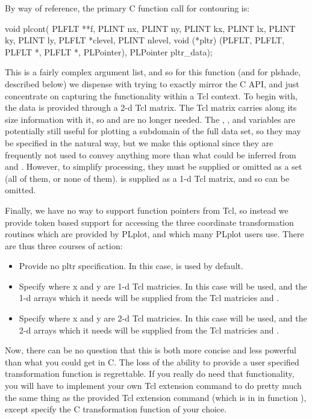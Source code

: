 By way of reference, the primary C function call for contouring is:
\begin{example}
void plcont( PLFLT **f, PLINT nx, PLINT ny, PLINT kx, PLINT lx,
             PLINT ky, PLINT ly, PLFLT *clevel, PLINT nlevel,
             void (*pltr) (PLFLT, PLFLT, PLFLT *, PLFLT *, PLPointer),
             PLPointer pltr_data);
\end{example}

This is a fairly complex argument list, and so for this function (and
for plshade, described below) we dispense with trying to exactly
mirror the C API, and just concentrate on capturing the functionality
within a Tcl context.  To begin with, the data is provided through a
2-d Tcl matrix.  The Tcl matrix carries along its size information
with it, so  and  are no longer needed.  The
, ,  and  variables are
potentially still  useful for plotting a subdomain of the full data
set, so they may be specified in the natural way, but we make this
optional since they are frequently not used to convey anything more
than what could be inferred from  and .  However, to
simplify processing, they must be supplied or omitted as a set (all of
them, or none of them).   is supplied as a 1-d Tcl
matrix, and so  can be omitted.  

Finally, we have no way to support function pointers from Tcl, so
instead we provide token based support for accessing the three
coordinate transformation routines which are provided by PLplot, and
which many PLplot users use.  There are thus three courses of action:
\begin{itemize}
\item Provide no pltr specification.  In this case,  is
used by default.

\item Specify  where x and y are 1-d Tcl matricies.
In this case  will be used, and the 1-d arrays which it
needs will be supplied from the Tcl matricies  and .

\item Specify  where x and y are 2-d Tcl matricies.
In this case  will be used, and the 2-d arrays which it
needs will be supplied from the Tcl matricies  and .
\end{itemize}

Now, there can be no question that this is both more concise and less
powerful than what you could get in C.  The loss of the ability to
provide a user specified transformation function is regrettable.  If
you really do need that functionality, you will have to implement your
own Tcl extension command to do pretty much the same thing as the
provided Tcl extension command  (which is in
 in function ), except specify the C
transformation function of your choice.


